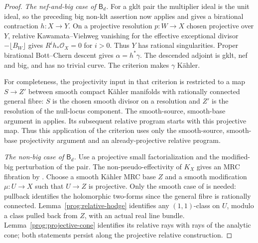\begin{proof}
\smallskip\noindent
\emph{The nef-and-big case of $\mathsf B_d$.}
For a gklt pair the multiplier ideal is the unit ideal, so the
preceding big non-klt assertion now applies and gives a birational
contraction $h:X\to Y$.
On a projective resolution $p:W\to X$ chosen projective over $Y$,
relative Kawamata--Viehweg vanishing for the effective exceptional
divisor $-\lfloor B_W\rfloor$ gives
$R^ih_*\mathcal O_X=0$ for $i>0$. Thus $Y$ has rational
singularities. Proper birational Bott--Chern descent
\cite[Lemma~8.7]{DHP} gives $\alpha=h^*\gamma$.
The descended adjoint is gklt, nef and big, and has no trivial
curve. The criterion \cite[Theorem~4.3]{HLX} makes $\gamma$
K\"ahler.

For completeness, the projectivity input in that criterion is
restricted to a map $S\to Z'$ between smooth compact K\"ahler
manifolds with rationally connected general fibre: $S$ is the
chosen smooth divisor on a resolution and $Z'$ is the resolution
of the null-locus component. The smooth-source, smooth-base
argument in \cite[Theorem~3.1, Step~1]{CH} applies. Its subsequent
relative program starts with this projective map. Thus this application of the criterion uses only the
smooth-source, smooth-base projectivity argument and an
already-projective relative program.

\smallskip\noindent
\emph{The non-big case of $\mathsf B_d$.}
Use a projective small factorialization and the modified-big
perturbation of the pair. The non-pseudo-effectivity of $K_X$
gives an MRC fibration by \cite{Ou2025}. Choose a smooth K\"ahler
MRC base $Z$ and a smooth modification $\mu:U\to X$ such that
$U\to Z$ is projective. Only the smooth case of
\cite[Theorem~3.1, Step~1]{CH} is needed: pullback identifies
the holomorphic two-forms since the general fibre is rationally
connected. Lemma~\ref{prog:relative-hodge} identifies any $(1,1)$-class on $U$,
modulo a class pulled back from $Z$, with an actual real line bundle.
Lemma~\ref{prog:projective-cone} identifies its relative rays
with rays of the analytic cone; both statements persist along the
projective relative construction.


\end{proof}
